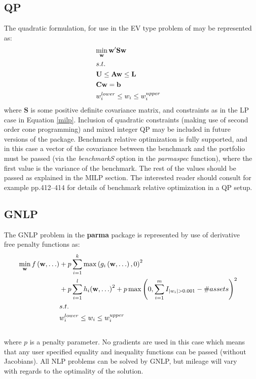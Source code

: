 \subsection{QP}
The quadratic formulation, for use in the EV type problem of
 may be represented as:
\begin{equation}\label{qp}
\begin{gathered}
  \mathop {\min }\limits_{\mathbf{w}} {\mathbf{w'Sw}} \hfill \\
  s.t. \hfill \\
  {\mathbf{U}} \leq {\mathbf{Aw}} \leq {\mathbf{L}} \hfill \\
  {\mathbf{Cw}}={\mathbf{b}} \hfill \\
  w_i^{lower} \leq {w_i} \leq w_i^{upper} \hfill \\
\end{gathered}
\end{equation}
where $\mathbf{S}$ is some positive definite covariance matrix, and
constraints as in the LP case in Equation \eqref{milp}. Inclusion of
quadratic constraints (making use of second order cone programming) and mixed
integer QP may be included in future versions of the package. Benchmark relative
optimization is fully supported, and in this case a vector of the covariance
between the benchmark and the portfolio must be passed (via the \emph{benchmarkS}
option in the \emph{parmaspec} function), where the first value is the variance of
the benchmark. The rest of the values should be passed as explained in the MILP
section. The interested reader should consult for example 
pp.412--414 for details of benchmark relative optimization in a QP setup.

\subsection{GNLP}
The GNLP problem in the \textbf{parma} package is represented by use of
derivative free penalty functions as:
\begin{align}
\mathop{\min }\limits_{\mathbf{w}}f\left( {{\mathbf{w}},\dots} \right) & +
{p}\sum\limits_{i=1}^k {\max {{\left( {{g_i}\left( {{\mathbf{w}},\dots}
\right),0} \right)}^2}}\\ \nonumber
& + {p}\sum\limits_{i=1}^l {{h_i}{{\left( {{\mathbf{w}}, \ldots } \right)}^2}}
+ {p}\max {\left( {0,\sum\limits_{i=1}^m {{I_{\left| {{w_i}} \right| > 0.001}} - \# assets} } \right)^2}\\
&s.t.\hfill \\ \nonumber
&w_i^{lower} \leq {w_i} \leq w_i^{upper}\\ \nonumber
\end{align}
where $p$ is a penalty parameter. No gradients are used in this case which means that
any user specified equality and inequality functions can be passed (without Jacobians).
All NLP problems can be solved by GNLP, but mileage will vary with regards to the optimality
of the solution.


